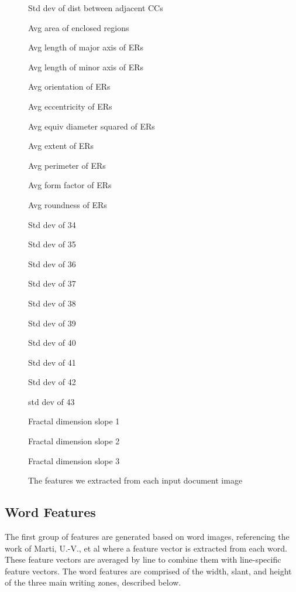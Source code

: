 \documentclass[paper=a4, fontsize=11pt]{scrartcl} %
\numberwithin{equation}{section} %
\numberwithin{figure}{section} %
\numberwithin{table}{section} %
\begin{document}
\begin{figure}
\begin{multicols}{3}
\begin{enumerate*}
    \item Std dev of dist between adjacent CCs
    \item Avg area of enclosed regions
    \item Avg length of major axis of ERs
    \item Avg length of minor axis of ERs
    \item Avg orientation of ERs
    \item Avg eccentricity of ERs
    \item Avg equiv diameter squared of ERs
    \item Avg extent of ERs
    \item Avg perimeter of ERs
    \item Avg form factor of ERs
    \item Avg roundness of ERs
    \item Std dev of 34
    \item Std dev of 35
    \item Std dev of 36
    \item Std dev of 37
    \item Std dev of 38
    \item Std dev of 39
    \item Std dev of 40
    \item Std dev of 41
    \item Std dev of 42
    \item std dev of 43
    \item Fractal dimension slope 1
    \item Fractal dimension slope 2
    \item Fractal dimension slope 3
    \end{enumerate*}
  \end{multicols}
  \caption{The features we extracted from each input document image}
  \label{fig:featureList}
\end{figure}

\subsection{Word Features}
The first group of features are generated based on word images,
referencing the work of Marti, U.-V., et al \cite{WriterID} where a
feature vector is extracted from each word. These feature vectors are
averaged by line to combine them with line-specific feature
vectors. The word features are comprised of the width, slant, and
height of the three main writing zones, described below.
\end{document}
